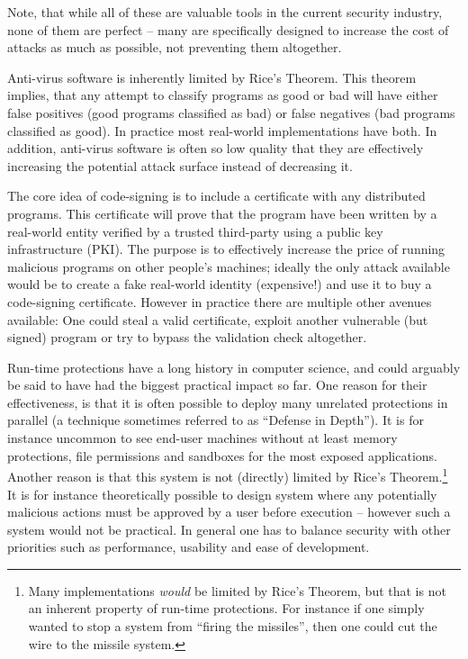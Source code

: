 Note, that while all of these are valuable tools in the current security
industry, none of them are perfect -- many are specifically designed to increase
the cost of attacks as much as possible, not preventing them altogether.

Anti-virus software is inherently limited by Rice's Theorem. This theorem
implies, that any attempt to classify programs as good or bad will have either
false positives (good programs classified as bad) or false negatives (bad
programs classified as good). In practice most real-world implementations have
both. In addition, anti-virus software is often so low quality that they are
effectively increasing the potential attack surface instead of decreasing
it.

The core idea of code-signing is to include a certificate with any distributed
programs. This certificate will prove that the program have been written by a
real-world entity verified by a trusted third-party using a public key
infrastructure (PKI). The purpose is to effectively increase the price of
running malicious programs on other people's machines; ideally the only attack
available would be to create a fake real-world identity (expensive!) and use it
to buy a code-signing certificate. However in practice there are multiple other
avenues available: One could steal a valid certificate, exploit another
vulnerable (but signed) program or try to bypass the validation check
altogether.

Run-time protections have a long history in computer science, and could arguably
be said to have had the biggest practical impact so far. One reason for their
effectiveness, is that it is often possible to deploy many unrelated protections
in parallel (a technique sometimes referred to as ``Defense in Depth''). It is
for instance uncommon to see end-user machines without at least memory
protections, file permissions and sandboxes for the most exposed
applications. Another reason is that this system is not (directly) limited by
Rice's Theorem.\footnote{Many implementations \emph{would} be limited by Rice's
  Theorem, but that is not an inherent property of run-time protections. For
  instance if one simply wanted to stop a system from ``firing the missiles'',
  then one could cut the wire to the missile system.} It is for instance
theoretically possible to design system where any potentially malicious actions
must be approved by a user before execution -- however such a system would not
be practical. In general one has to balance security with other priorities such
as performance, usability and ease of development.

